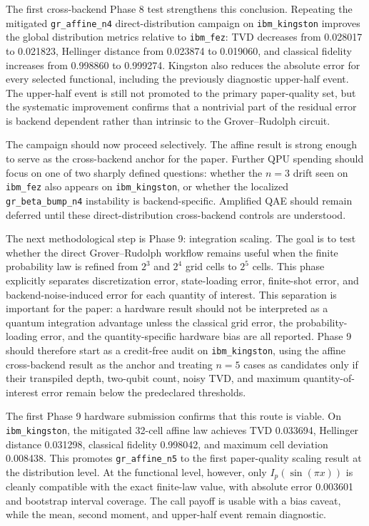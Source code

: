 The first cross-backend Phase 8 test strengthens this conclusion. Repeating the
mitigated \texttt{gr\_affine\_n4} direct-distribution campaign on
\texttt{ibm\_kingston} improves the global distribution metrics relative to
\texttt{ibm\_fez}: TVD decreases from 0.028017 to 0.021823, Hellinger distance
from 0.023874 to 0.019060, and classical fidelity increases from 0.998860 to
0.999274. Kingston also reduces the absolute error for every selected
functional, including the previously diagnostic upper-half event. The upper-half
event is still not promoted to the primary paper-quality set, but the systematic
improvement confirms that a nontrivial part of the residual error is backend
dependent rather than intrinsic to the Grover--Rudolph circuit.

The campaign should now proceed selectively. The affine result is strong enough
to serve as the cross-backend anchor for the paper. Further QPU spending should
focus on one of two sharply defined questions: whether the \(n=3\) drift seen on
\texttt{ibm\_fez} also appears on \texttt{ibm\_kingston}, or whether the
localized \texttt{gr\_beta\_bump\_n4} instability is backend-specific. Amplified
QAE should remain deferred until these direct-distribution cross-backend
controls are understood.

The next methodological step is Phase 9: integration scaling. The goal is to
test whether the direct Grover--Rudolph workflow remains useful when the
finite probability law is refined from \(2^3\) and \(2^4\) grid cells to
\(2^5\) cells. This phase explicitly separates discretization error,
state-loading error, finite-shot error, and backend-noise-induced error for
each quantity of interest. This separation is important for the paper: a
hardware result should not be interpreted as a quantum integration advantage
unless the classical grid error, the probability-loading error, and the
quantity-specific hardware bias are all reported. Phase 9 should therefore
start as a credit-free audit on \texttt{ibm\_kingston}, using the affine
cross-backend result as the anchor and treating \(n=5\) cases as candidates only
if their transpiled depth, two-qubit count, noisy TVD, and maximum
quantity-of-interest error remain below the predeclared thresholds.

The first Phase 9 hardware submission confirms that this route is viable. On
\texttt{ibm\_kingston}, the mitigated 32-cell affine law achieves TVD 0.033694,
Hellinger distance 0.031298, classical fidelity 0.998042, and maximum cell
deviation 0.008438. This promotes \texttt{gr\_affine\_n5} to the first
paper-quality scaling result at the distribution level. At the functional
level, however, only
\(I_p(\sin(\pi x))\) is cleanly compatible with the exact finite-law value, with
absolute error 0.003601 and bootstrap interval coverage. The call payoff is
usable with a bias caveat, while the mean, second moment, and upper-half event
remain diagnostic.

